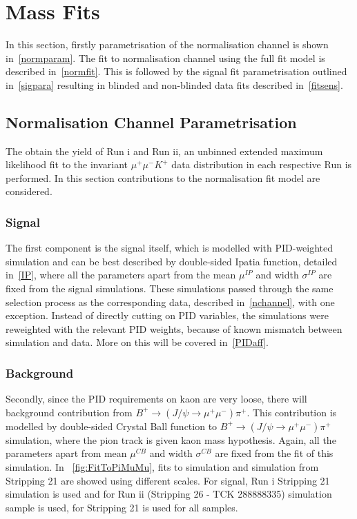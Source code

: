 \newpage
\section{Mass Fits}
In this section, firstly parametrisation of the normalisation channel is shown in~\autoref{normparam}. The fit to normalisation channel using the full fit model is described in~\autoref{normfit}. This is followed by the signal fit parametrisation outlined in~\autoref{sigpara} resulting in blinded and non-blinded data fits described in~\autoref{fitsens}.

\subsection{Normalisation Channel Parametrisation}
\label{normparam}

The obtain the \bjpsimumuk yield of Run \Rn{1} and Run \Rn{2}, an unbinned extended maximum likelihood fit to the invariant $\mu^{+} \mu^{-} K^{+}$ data distribution in each respective Run is performed. In this section contributions to the normalisation fit model are considered. 

\subsubsection{Signal}

The first component is the signal itself, which is modelled with PID-weighted simulation and can be best described by double-sided Ipatia function, detailed in~\autoref{IP}, where all the parameters apart from the mean $\mu^{IP}$ and width $\sigma^{IP}$ are fixed from the signal simulations. These simulations passed through the same selection process as the corresponding \bjpsimumuk data, described in~\autoref{nchannel}, with one exception. Instead of directly cutting on \gls{PID} variables, the simulations were reweighted with the relevant PID weights, because of known mismatch between simulation and data. More on this will be covered in~\autoref{PIDaff}. 


\subsubsection{\mb{\bjpsimumupi} Background}

Secondly, since the PID requirements on kaon are very loose, there will background contribution from $ B^{+} \rightarrow (J/\psi \rightarrow \mu^{+} \mu^{-}) \pi^{+}$. This contribution is modelled by double-sided Crystal Ball function to $B^{+} \rightarrow (J/\psi \rightarrow \mu^{+} \mu^{-}) \pi^{+}$ simulation, where the pion track is given kaon mass hypothesis. Again, all the parameters apart from mean $\mu^{CB}$ and width $\sigma^{CB}$ are fixed from the fit of this simulation. In ~\autoref{fig:FitToPiMuMu}, fits to \bjpsimumuk simulation and \bjpsimumupi simulation from Stripping 21 are showed using different scales.
For signal, Run \Rn{1} Stripping 21 simulation is used and for Run \Rn{2} (Stripping 26 - TCK 288888335) simulation sample is used, for \bjpsimumupi Stripping 21 is used for all samples.

